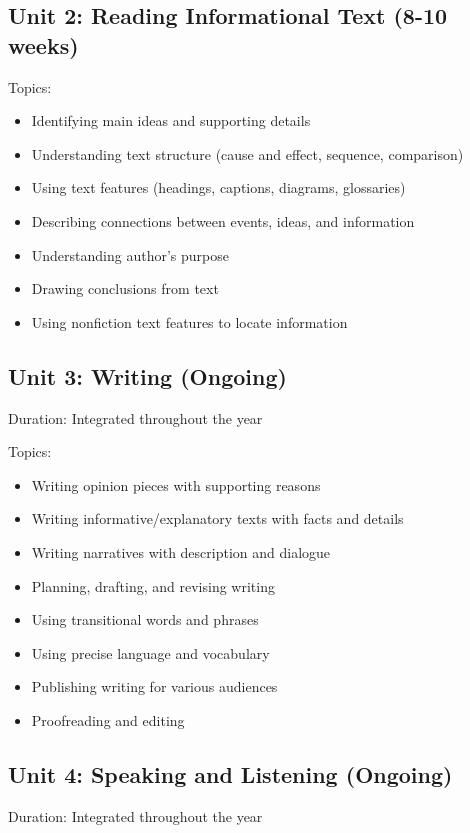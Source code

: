\documentclass[11pt,letterpaper]{report}
\begin{document}
\subsection{Unit 2: Reading Informational Text (8-10 weeks)}

Topics:
\begin{itemize}
\item Identifying main ideas and supporting details
\item Understanding text structure (cause and effect, sequence, comparison)
\item Using text features (headings, captions, diagrams, glossaries)
\item Describing connections between events, ideas, and information
\item Understanding author's purpose
\item Drawing conclusions from text
\item Using nonfiction text features to locate information
\end{itemize}

\subsection{Unit 3: Writing (Ongoing)}

Duration: Integrated throughout the year

Topics:
\begin{itemize}
\item Writing opinion pieces with supporting reasons
\item Writing informative/explanatory texts with facts and details
\item Writing narratives with description and dialogue
\item Planning, drafting, and revising writing
\item Using transitional words and phrases
\item Using precise language and vocabulary
\item Publishing writing for various audiences
\item Proofreading and editing
\end{itemize}

\subsection{Unit 4: Speaking and Listening (Ongoing)}

Duration: Integrated throughout the year
\end{document}
